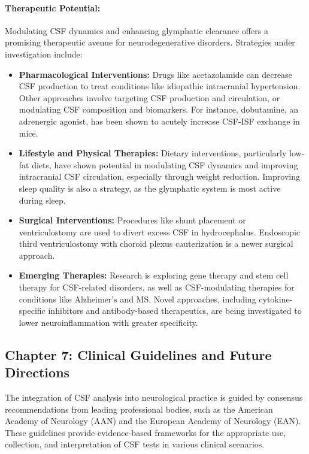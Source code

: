 	\paragraph{Therapeutic Potential:} Modulating CSF dynamics and enhancing glymphatic clearance offers a promising therapeutic avenue for neurodegenerative disorders. Strategies under investigation include:
	\begin{itemize}
		\item \textbf{Pharmacological Interventions:} Drugs like acetazolamide can decrease CSF production to treat conditions like idiopathic intracranial hypertension. Other approaches involve targeting CSF production and circulation, or modulating CSF composition and biomarkers. For instance, dobutamine, an adrenergic agonist, has been shown to acutely increase CSF-ISF exchange in mice.
		\item \textbf{Lifestyle and Physical Therapies:} Dietary interventions, particularly low-fat diets, have shown potential in modulating CSF dynamics and improving intracranial CSF circulation, especially through weight reduction. Improving sleep quality is also a strategy, as the glymphatic system is most active during sleep.
		\item \textbf{Surgical Interventions:} Procedures like shunt placement or ventriculostomy are used to divert excess CSF in hydrocephalus. Endoscopic third ventriculostomy with choroid plexus cauterization is a newer surgical approach.
		\item \textbf{Emerging Therapies:} Research is exploring gene therapy and stem cell therapy for CSF-related disorders, as well as CSF-modulating therapies for conditions like Alzheimer's and MS. Novel approaches, including cytokine-specific inhibitors and antibody-based therapeutics, are being investigated to lower neuroinflammation with greater specificity.
	\end{itemize}
	
	\subsection*{Chapter 7: Clinical Guidelines and Future Directions}
	
	The integration of CSF analysis into neurological practice is guided by consensus recommendations from leading professional bodies, such as the American Academy of Neurology (AAN) and the European Academy of Neurology (EAN). These guidelines provide evidence-based frameworks for the appropriate use, collection, and interpretation of CSF tests in various clinical scenarios.
	
